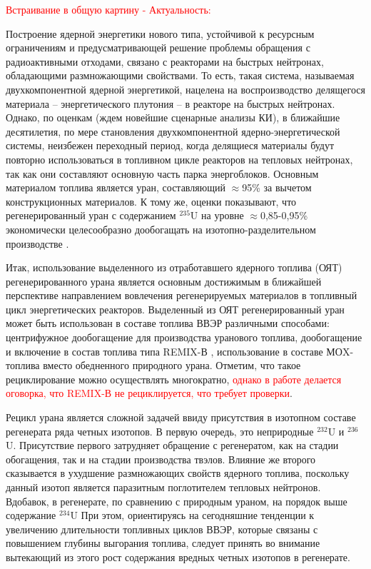 
{\actuality}

\textcolor{red}{Встраивание в общую картину - Актуальность:}

Построение ядерной энергетики нового типа, устойчивой к ресурсным ограничениям и предусматривающей решение проблемы обращения с радиоактивными отходами, связано с реакторами на быстрых нейтронах, обладающими размножающими свойствами. То есть, такая система, называемая двухкомпонентной ядерной энергетикой, нацелена на воспроизводство делящегося материала -- энергетического  плутония -- в реакторе на быстрых нейтронах. Однако, по оценкам (ждем новейшие сценарные анализы КИ), в ближайшие десятилетия, по мере становления двухкомпонентной ядерно-энергетической системы, неизбежен переходный период, когда делящиеся материалы будут повторно использоваться в топливном цикле реакторов на тепловых нейтронах, так как они составляют основную часть парка энергоблоков. Основным материалом топлива является уран, составляющий $\approx$95\% за вычетом конструкционных материалов. К тому же, оценки показывают, что регенерированный уран с содержанием $^{235}$U на уровне $\approx$0,85-0,95\% экономически целесообразно дообогащать на изотопно-разделительном производстве \cite{NikipelovNikipelovSudby}.

Итак, использование выделенного из отработавшего ядерного топлива (ОЯТ) регенерированного урана является основным достижимым в ближайшей перспективе направлением вовлечения регенерируемых материалов в топливный цикл энергетических реакторов. Выделенный из ОЯТ регенерированный уран может быть использован в составе топлива ВВЭР различными способами: центрифужное дообогащение для производства уранового топлива, дообогащение и включение в состав топлива типа REMIX-В \cite{zilbermanVozmozhnostIspolzovaniyaTopliva2012}, использование в составе МОX-топлива вместо обедненного природного урана. Отметим, что такое рециклирование можно осуществлять многократно, \textcolor{red}{однако в работе \cite{postovarovaRadiacionnyeHarakteristikiRemikstopliva} делается оговорка, что REMIX-В не рециклируется, что требует проверки}.

Рецикл урана является сложной задачей ввиду присутствия в изотопном составе регенерата ряда четных изотопов. В первую очередь, это неприродные $^{232}$U и $^{236}$U. Присутствие первого затрудняет обращение с регенератом, как на стадии обогащения, так и на стадии производства твэлов. Влияние же второго сказывается в ухудшение размножающих свойств ядерного топлива, поскольку данный изотоп является паразитным поглотителем тепловых нейтронов. Вдобавок, в регенерате, по сравнению с природным ураном, на порядок выше содержание $^{234}$U При этом, ориентируясь на сегодняшние тенденции к увеличению длительности топливных циклов ВВЭР, которые связаны с повышением глубины выгорания топлива, следует принять во внимание вытекающий из этого рост содержания вредных четных изотопов в регенерате.

